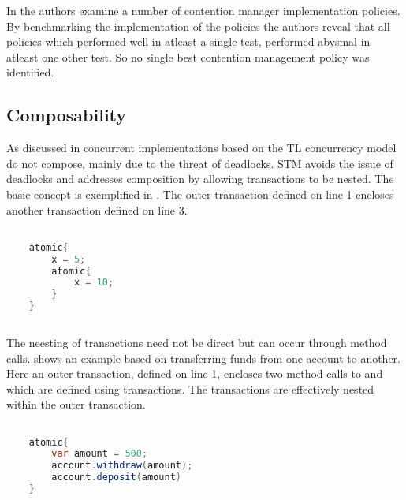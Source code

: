 In \cite{scherer2004contention} the authors examine a number of contention manager implementation policies. By benchmarking the implementation of the policies the authors reveal that all policies which performed well in atleast a single test, performed abysmal in atleast one other test. So no single best contention management policy was identified.

\subsection{Composability}
\label{sec:stm_composability}
As discussed in  concurrent implementations based on the \ac{TL} concurrency model do not compose, mainly due to the threat of deadlocks. \ac{STM} avoids the issue of deadlocks and addresses composition by allowing transactions to be nested. The basic concept is exemplified in . The outer transaction defined on line 1 encloses another transaction defined on line 3.

\begin{lstlisting}[label=lst:stm_nested_transactions,
  caption={Nested transactions},
  language=Java,  
  showspaces=false,
  showtabs=false,
  breaklines=true,
  showstringspaces=false,
  breakatwhitespace=true,
  commentstyle=\color{greencomments},
  keywordstyle=\color{bluekeywords},
  stringstyle=\color{redstrings},
  morekeywords={atomic, retry, orElse, var}]  % Start your code-block

	atomic{
		x = 5;
		atomic{
			x = 10;		
		}
	}
       
\end{lstlisting}
The neesting of transactions need not be direct but can occur through method calls.  shows an example based on transferring funds from one account to another. Here an outer transaction, defined on line 1, encloses two method calls to  and  which are defined using transactions. The transactions are effectively nested within the outer transaction.
\begin{lstlisting}[label=lst:stm_nested_transactions_real,
  caption={Real world nested transactions},
  language=Java,  
  showspaces=false,
  showtabs=false,
  breaklines=true,
  showstringspaces=false,
  breakatwhitespace=true,
  commentstyle=\color{greencomments},
  keywordstyle=\color{bluekeywords},
  stringstyle=\color{redstrings},
  morekeywords={atomic, retry, orElse, var}]  % Start your code-block

	atomic{
		var amount = 500;
		account.withdraw(amount);
		account.deposit(amount)
	}
       
\end{lstlisting}

